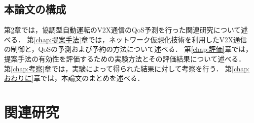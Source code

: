 \documentclass[a4paper,11pt,uplatex]{ujreport}
\begin{document}




\section{本論文の構成}
\label{sec:本論文の構成}

  第\ref{chap:関連研究}章では，協調型自動運転のV2X通信のQoS予測を行った関連研究について述べる．
  第\ref{chap:提案手法}章では，ネットワーク仮想化技術を利用したV2X通信の制御と，QoSの予測および予約の方法について述べる．
  第\ref{chap:評価}章では，提案手法の有効性を評価するための実験方法とその評価結果について述べる．
  第\ref{chap:考察}章では，実験によって得られた結果に対して考察を行う．
  第\ref{chap:おわりに}章では，本論文のまとめを述べる．


\chapter{関連研究}
\label{chap:関連研究}
\end{document}
